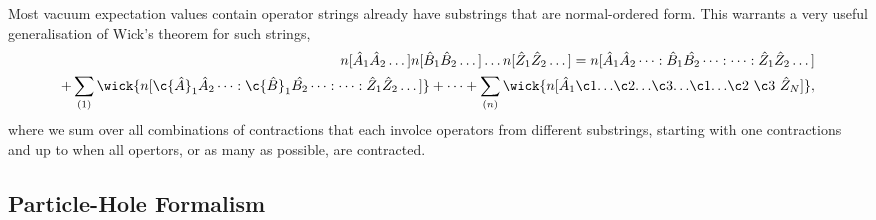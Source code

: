 		Most vacuum expectation values contain operator strings already have substrings
		that are normal-ordered form. This warrants a very useful generalisation of
		Wick's theorem for such strings,
		\begin{equation}
			\begin{aligned}
			n[\hat{A}_1\hat{A}_2 \dots ]
			n[\hat{B}_1\hat{B}_2 \dots ] \dots
			n[\hat{Z}_1\hat{Z}_2 \dots ]
			= n[\hat{A}_1\hat{A}_2\dots:
				\hat{B}_1\hat{B_2}\dots:
				\dots:
				\hat{Z}_1\hat{Z}_2\dots] \\
			+ \sum_{(1)}
				\wick{n[
				\c{\hat{A}}_1\hat{A}_2\dots:
				\c{\hat{B}}_1\hat{B_2}\dots:
				\dots:
				\hat{Z}_1\hat{Z}_2\dots]}
			+ \dots 
			+ \sum_{(n)}
				\wick{n[		
				\hat{A}_1 \c1{\dots} \c2{\dots} \c3{\dots} 
					\c1{\dots} \c2{\ } \c3{\ } \hat{Z}_N
				]},
			\end{aligned}
		\end{equation}
		where we sum over all combinations of contractions that each involce operators 
		from different substrings, starting with one contractions and up to when all
		opertors, or as many as possible, are contracted.

    \subsection{Particle-Hole Formalism}

